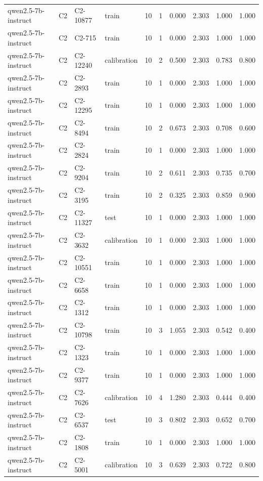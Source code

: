 \begin{table}
\begin{tabular}{llllrrrrrr}
qwen2.5-7b-instruct & C2 & C2-10877 & train & 10 & 1 & 0.000 & 2.303 & 1.000 & 1.000 \\
qwen2.5-7b-instruct & C2 & C2-715 & train & 10 & 1 & 0.000 & 2.303 & 1.000 & 1.000 \\
qwen2.5-7b-instruct & C2 & C2-12240 & calibration & 10 & 2 & 0.500 & 2.303 & 0.783 & 0.800 \\
qwen2.5-7b-instruct & C2 & C2-2893 & train & 10 & 1 & 0.000 & 2.303 & 1.000 & 1.000 \\
qwen2.5-7b-instruct & C2 & C2-12295 & train & 10 & 1 & 0.000 & 2.303 & 1.000 & 1.000 \\
qwen2.5-7b-instruct & C2 & C2-8494 & train & 10 & 2 & 0.673 & 2.303 & 0.708 & 0.600 \\
qwen2.5-7b-instruct & C2 & C2-2824 & train & 10 & 1 & 0.000 & 2.303 & 1.000 & 1.000 \\
qwen2.5-7b-instruct & C2 & C2-9204 & train & 10 & 2 & 0.611 & 2.303 & 0.735 & 0.700 \\
qwen2.5-7b-instruct & C2 & C2-3195 & train & 10 & 2 & 0.325 & 2.303 & 0.859 & 0.900 \\
qwen2.5-7b-instruct & C2 & C2-11327 & test & 10 & 1 & 0.000 & 2.303 & 1.000 & 1.000 \\
qwen2.5-7b-instruct & C2 & C2-3632 & calibration & 10 & 1 & 0.000 & 2.303 & 1.000 & 1.000 \\
qwen2.5-7b-instruct & C2 & C2-10551 & train & 10 & 1 & 0.000 & 2.303 & 1.000 & 1.000 \\
qwen2.5-7b-instruct & C2 & C2-6658 & train & 10 & 1 & 0.000 & 2.303 & 1.000 & 1.000 \\
qwen2.5-7b-instruct & C2 & C2-1312 & train & 10 & 1 & 0.000 & 2.303 & 1.000 & 1.000 \\
qwen2.5-7b-instruct & C2 & C2-10798 & train & 10 & 3 & 1.055 & 2.303 & 0.542 & 0.400 \\
qwen2.5-7b-instruct & C2 & C2-1323 & train & 10 & 1 & 0.000 & 2.303 & 1.000 & 1.000 \\
qwen2.5-7b-instruct & C2 & C2-9377 & train & 10 & 1 & 0.000 & 2.303 & 1.000 & 1.000 \\
qwen2.5-7b-instruct & C2 & C2-7626 & calibration & 10 & 4 & 1.280 & 2.303 & 0.444 & 0.400 \\
qwen2.5-7b-instruct & C2 & C2-6537 & test & 10 & 3 & 0.802 & 2.303 & 0.652 & 0.700 \\
qwen2.5-7b-instruct & C2 & C2-1808 & train & 10 & 1 & 0.000 & 2.303 & 1.000 & 1.000 \\
qwen2.5-7b-instruct & C2 & C2-5001 & calibration & 10 & 3 & 0.639 & 2.303 & 0.722 & 0.800 \\

\end{tabular}
\end{table}
